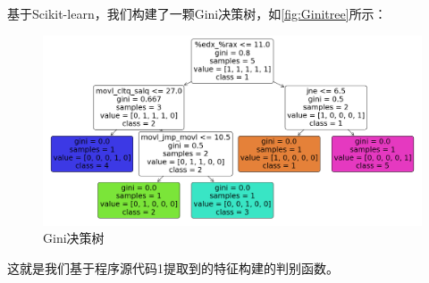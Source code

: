 基于Scikit-learn\cite{scikit-learn}，我们构建了一颗Gini决策树，如\autoref{fig:Ginitree}所示：
\begin{figure}
	\centering
	\includegraphics[width=1\linewidth]{figures/Ginitree.png}
	\caption{Gini决策树}
	\label{fig:Ginitree}
\end{figure}
这就是我们基于程序源代码1提取到的特征构建的判别函数。
\vspace*{1cm}
